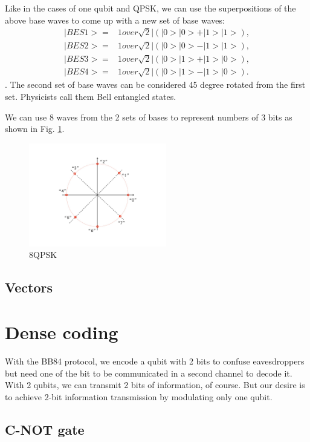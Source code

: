 \documentclass{book}
\begin{document}
Like in the cases of one qubit and QPSK, we can use the superpositions of the above base waves to come up with a new set of base waves:
\begin{equation}
\begin{array}{rl}
    |BES1> =& 1 over {\sqrt 2}| (|0>|0>+|1>|1>),\\
    |BES2> =& 1 over {\sqrt 2}| (|0>|0>-|1>|1>),\\
    |BES3> =& 1 over {\sqrt 2}| (|0>|1>+|1>|0>),\\
    |BES4> =& 1 over {\sqrt 2}| (|0>|1>-|1>|0>).
\end{array}
\end{equation}.
The second set of base waves can be considered 45 degree rotated from the first set. Physicists call them Bell entangled states.

We can use 8 waves from the 2 sets of bases to represent numbers of 3 bits as shown in Fig. \ref{8qpsk}.
\begin{figure}[ht]
\includegraphics[width=6cm]{pic/8qpsk.jpg}
\caption{8QPSK}
\label{8qpsk}
\end{figure}

\subsection{Vectors}

\section{Dense coding}
With the BB84 protocol, we encode a qubit with 2 bits to confuse eavesdroppers but need one of the bit to be communicated in a second channel to decode it. With 2 qubits, we can transmit 2 bits of information, of course. But our desire is to achieve 2-bit information transmission by modulating only one qubit.

\subsection{C-NOT gate}
\end{document}
